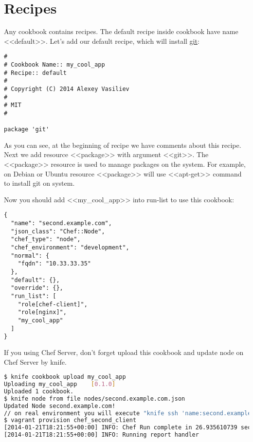\section{Recipes}

Any cookbook contains recipes. The default recipe inside cookbook have name <<default>>. Let's add our default recipe, which will install \href{http://git-scm.com/}{git}:

\begin{lstlisting}[label=lst:cookbook-recipes1,title=my-server-cloud/site-cookbooks/my\_cool\_app/recipes/default.rb]
#
# Cookbook Name:: my_cool_app
# Recipe:: default
#
# Copyright (C) 2014 Alexey Vasiliev
#
# MIT
#

package 'git'
\end{lstlisting}

As you can see, at the beginning of recipe we have comments about this recipe. Next we add resource <<package>> with argument <<git>>. The <<package>> resource is used to manage packages on the system. For example, on Debian or Ubuntu resource <<package>> will use <<apt-get>> command to install git on system.

Now you should add <<my\_cool\_app>> into run-list to use this cookbook:

\begin{lstlisting}[label=lst:cookbook-recipes2,title=my-server-cloud/site-cookbooks/nodes/second.example.com.json]
{
  "name": "second.example.com",
  "json_class": "Chef::Node",
  "chef_type": "node",
  "chef_environment": "development",
  "normal": {
    "fqdn": "10.33.33.35"
  },
  "default": {},
  "override": {},
  "run_list": [
    "role[chef-client]",
    "role[nginx]",
    "my_cool_app"
  ]
}
\end{lstlisting}

If you using Chef Server, don't forget upload this cookbook and update node on Chef Server by knife.

\begin{lstlisting}[language=Bash,label=lst:cookbook-recipes3]
$ knife cookbook upload my_cool_app
Uploading my_cool_app    [0.1.0]
Uploaded 1 cookbook.
$ knife node from file nodes/second.example.com.json
Updated Node second.example.com!
// on real environment you will execute "knife ssh 'name:second.example.com' 'sudo chef-client' -i ../keys/production.pem -x ubuntu"
$ vagrant provision chef_second_client
[2014-01-21T18:21:55+00:00] INFO: Chef Run complete in 26.935610739 seconds
[2014-01-21T18:21:55+00:00] INFO: Running report handler
\end{lstlisting}


